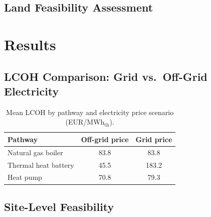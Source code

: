\documentclass[12pt, a4paper]{article}
\begin{document}
\subsection{Land Feasibility Assessment}

\section{Results}
\label{sec:results}

\subsection{LCOH Comparison: Grid vs.\ Off-Grid Electricity}


\begin{table}[H]
  \centering
  \caption{Mean LCOH by pathway and electricity price scenario (EUR/MWh$_\text{th}$).}
  \label{tab:lcoh}
  \begin{tabular}{lcc}
    \toprule
    \textbf{Pathway}       & \textbf{Off-grid price} & \textbf{Grid price} \\
    \midrule
    Natural gas boiler     & 83.8  & 83.8  \\
    Thermal heat battery   & 45.5  & 183.2 \\
    Heat pump              & 70.8  & 79.3  \\
    \bottomrule
  \end{tabular}
\end{table}


\subsection{Site-Level Feasibility}
\end{document}
